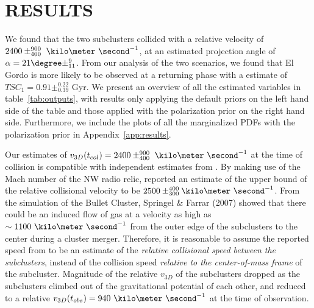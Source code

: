 \section{RESULTS} 
We found that the two subclusters collided with a relative velocity of $2400\pm^{900}_{400}~\kilo\meter~\second^{-1}$, at an estimated projection
angle of $\alpha = 21\degree\pm^{9}_{11}$. From our analysis of the two
scenarios, we found that El Gordo is more likely to be observed at a returning
phase with a estimate of $TSC_1 = 0.91\pm^{0.22}_{0.39}$ Gyr. We present an
overview of all the estimated variables in table~\ref{tab:outputs}, with
results only applying the default priors on the left hand side of the table
and those applied with the polarization prior on the right hand side.
Furthermore, we include the plots of all the marginalized PDFs with the
polarization prior in Appendix~\ref{app:results}. \par 
Our estimates of $v_{3D}(t_{col}) = 2400\pm^{900}_{400}~\kilo\meter~\second^{-1}$ 
at the time of collision is compatible with independent estimates from \citealt{L13}. 
By making use of the Mach number of the NW radio relic, \cite{L13}
reported an estimate of the upper bound of the relative collisional
velocity to be $2500
\pm^{400}_{300}\kilo\meter~\second^{-1}$. 
From the simulation of the Bullet Cluster, Springel \& Farrar (2007) showed that there could be an induced flow of gas at a
velocity as high as $\sim 1100~\kilo\meter~\second^{-1}$ from the outer
edge of the subclusters to the center during a cluster merger. Therefore,
it is reasonable to assume the reported speed from \cite{L13} to be
an estimate of the {\it relative collisional speed between the subclusters}, instead
of the collision speed {\it relative to the center-of-mass frame} of the
subcluster. Magnitude of the relative $v_{3D}$ of the subclusters dropped as the subclusters climbed out of the gravitational potential of each
other, and reduced to a relative $v_{3D}(t_{obs}) = 940~\kilo\meter~\second^{-1}$ at
the time of observation.\par 

